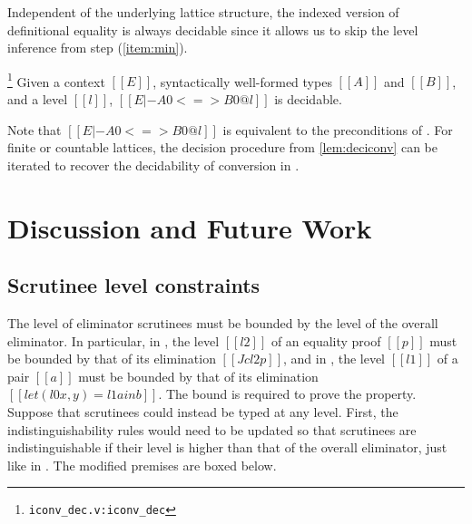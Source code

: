 \documentclass[acmsmall, screen=true, nonacm=true,
  review=\ifpublic false\else true\fi,
  anonymous=\ifanonymous true\else false\fi
]{acmart}
\newcommand{\sw}[1]{}
\newcommand{\suppl}[3]{{\scriptsize\texttt{#2:#3}}}
\newlength{\punctwidth}
\newcommand{\stack}[1]{%
  \settowidth{\punctwidth}{#1}%
  \hspace*{-\the\punctwidth}%
}
\begin{document}
Independent of the underlying lattice structure, the 
indexed version of definitional equality is always decidable since it
allows us to skip the level inference from step (\ref{item:min}).
\begin{theorem}
  \stack{.~}\footnote{\suppl{theories}{iconv\_dec.v}{iconv\_dec}}
  \label{lem:deciconv}
  Given a context $[[E]]$, syntactically well-formed types $[[A]]$ and
  $[[B]]$, and a level $[[l]]$, $[[E |- A0 <=> B0 @ l]]$ is decidable.
\end{theorem}
Note that $[[E |- A0 <=> B0 @ l]]$ is equivalent to the preconditions of .
For finite or countable lattices, the decision procedure from
\cref{lem:deciconv} can be iterated to recover the decidability
of conversion in .

\section{Discussion and Future Work}

\subsection{Scrutinee level constraints} \label{sec:scrutinee-level}
\sw{I wish this section talked a little more about strictness. If we had a CBV application,
then I guess we would need to have a scrutinee constraint in application. OTOH, if we have
a lazy let term, we would not need this constraint.}

The level of eliminator scrutinees must be bounded by the level of the overall eliminator.
In particular, in , the level $[[l2]]$ of an equality proof $[[p]]$
must be bounded by that of its elimination $[[J c l2 p]]$,
and in , the level $[[l1]]$ of a pair $[[a]]$
must be bounded by that of its elimination $[[let (l0 x, y) = l1 a in b]]$.
The bound is required to prove the  property.
Suppose that scrutinees could instead be typed at any level.
First, the indistinguishability rules would need to be updated
so that scrutinees are indistinguishable if their level is higher
than that of the overall eliminator, just like in .
The modified premises are boxed below.
%
\end{document}
